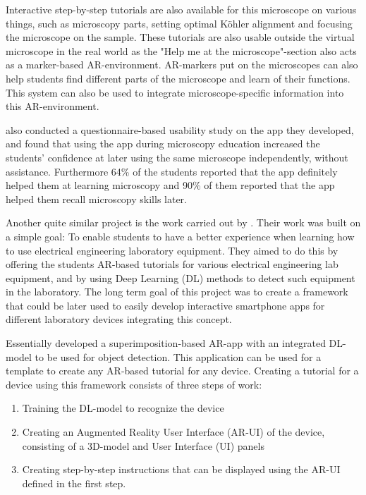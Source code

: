 Interactive step-by-step tutorials are also available for this microscope on 
various things, such as microscopy parts, setting optimal Köhler alignment 
and focusing the microscope on the sample. These tutorials are also usable 
outside the virtual microscope in the real world as the "Help me at the 
microscope"-section also acts as a marker-based 
AR-environment.\cite{pylvanainen} AR-markers put on the microscopes can also 
help students find different parts of the microscope and learn of their 
functions. This system can also be used to integrate microscope-specific 
information into this AR-environment.\cite{pylvanainen} \par
	\textcite{pylvanainen} also conducted a questionnaire-based usability 
study on the app they developed, and found that using the app during 
microscopy education increased the students' confidence at later using the 
same microscope independently, without assistance. Furthermore 64\% of the 
students reported that the app definitely helped them at learning microscopy 
and 90\% of them reported that the app helped them recall microscopy skills 
later.\cite{pylvanainen} \par
	Another quite similar project is the work carried out by 
\textcite{estrada}. Their work was built on a simple goal: To enable students 
to have a better experience when learning how to use electrical engineering 
laboratory equipment. They aimed to do this by offering the students AR-based 
tutorials for various electrical engineering lab equipment, and by using Deep 
Learning (DL) methods to detect such equipment in the 
laboratory.\cite{estrada} The long term goal of this project was to create a 
framework that could be later used to easily develop interactive smartphone 
apps for different laboratory devices integrating this 
concept.\cite{estrada} \par
	Essentially \textcite{estrada} developed a superimposition-based 
AR-app with an integrated DL-model to be used for object detection. This 
application can be used for a template to create any AR-based tutorial for 
any device. Creating a tutorial for a device using this framework consists of 
three steps of work:
\begin{enumerate}
	\item Training the DL-model to recognize the device
	\item Creating an Augmented Reality User Interface (AR-UI) of the device, consisting of a 3D-model and User Interface (UI) panels
	\item Creating step-by-step instructions that can be displayed using the AR-UI defined in the first step.
\end{enumerate} \par
